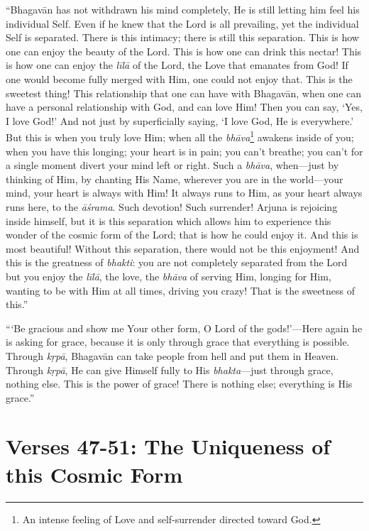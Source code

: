 \documentclass[12pt, twoside, openright]{memoir}
\begin{document}
\enquote{Bhagavān has not withdrawn his mind completely, He is still letting him feel his individual Self. Even if he knew that the Lord is all prevailing, yet the individual Self is separated. There is this intimacy; there is still this separation. This is how one can enjoy the beauty of the Lord. This is how one can drink this nectar! This is how one can enjoy the \textit{līlā} of the Lord, the Love that emanates from God! If one would become fully merged with Him, one could not enjoy that. This is the sweetest thing! This relationship that one can have with Bhagavān, when one can have a personal relationship with God, and can love Him! Then you can say, \enquote{Yes, I love God!} And not just by superficially saying, \enquote{I love God, He is everywhere.} But this is when you truly love Him; when all the \textit{bhāva}\footnote{An intense feeling of Love and self-surrender directed toward God.} awakens inside of you; when you have this longing; your heart is in pain; you can’t breathe; you can’t for a single moment divert your mind left or right. Such a \textit{bhāva}, when---just by thinking of Him, by chanting His Name, wherever you are in the world---your mind, your heart is always with Him! It always runs to Him, as your heart always runs here, to the \textit{āśrama}. Such devotion! Such surrender! Arjuna is rejoicing inside himself, but it is this separation which allows him to experience this wonder of the cosmic form of the Lord; that is how he could enjoy it. And this is most beautiful! Without this separation, there would not be this enjoyment! And this is the greatness of \textit{bhakti}: you are not completely separated from the Lord but you enjoy the \textit{līlā}, the love, the \textit{bhāva} of serving Him, longing for Him, wanting to be with Him at all times, driving you crazy! That is the sweetness of this.}

\enquote{\enquote{Be gracious and show me Your other form, O Lord of the gods!}---Here again he is asking for grace, because it is only through grace that everything is possible. Through \textit{kṛpā}, Bhagavān can take people from hell and put them in Heaven. Through \textit{kṛpā}, He can give Himself fully to His \textit{bhakta}---just through grace, nothing else. This is the power of grace! There is nothing else; everything is His grace.}

\section{Verses 47-51: The Uniqueness of this Cosmic Form}\label{sec-verses-47-51-the-uniqueness-of-this-cosmic-form}
\end{document}
